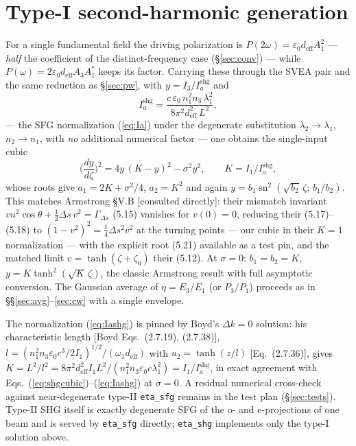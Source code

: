 \documentclass[aps,pra,preprint,amsmath,amssymb,nofootinbib,superscriptaddress]{revtex4-2}
\newcommand{\deff}{d_{\mathrm{eff}}}
\newcommand{\sn}{\operatorname{sn}}
\begin{document}
\section{Type-I second-harmonic generation}\label{sec:shg}

For a single fundamental field the driving polarization is
$P(2\omega)=\varepsilon_0\deff A_1^{2}$ --- \emph{half} the coefficient of
the distinct-frequency case (\S\ref{sec:conv}) --- while
$P(\omega)=2\varepsilon_0\deff A_3A_1^{*}$ keeps its factor. Carrying these
through the SVEA pair and the same reduction as \S\ref{sec:pw}, with
$y=I_3/I_a^{\mathrm{shg}}$ and
\begin{equation}
I_a^{\mathrm{shg}}
=\frac{c\,\varepsilon_0\, n_1^{2} n_3\, \lambda_1^{2}}
      {8\pi^{2}\deff^{2}\,L^{2}},
\label{eq:Iashg}
\end{equation}
--- the SFG normalization (\ref{eq:Ia}) under the degenerate substitution
$\lambda_2\to\lambda_1$, $n_2\to n_1$, with \emph{no} additional numerical
factor --- one obtains the single-input cubic
\begin{equation}
\Big(\frac{dy}{d\zeta}\Big)^{2}=4y\,(K-y)^{2}-\sigma^{2}y^{2},
\qquad K = I_{1}/I_a^{\mathrm{shg}},
\label{eq:shgcubic}
\end{equation}
whose roots give $a_1=2K+\sigma^{2}/4$, $a_2=K^{2}$ and again
$y=b_1\sn^{2}(\sqrt{b_2}\,\zeta;\,b_1/b_2)$. This matches Armstrong \S V.B
[consulted directly]: their mismatch invariant
$vu^2\cos\theta+\tfrac12\Delta s\,v^2=\Gamma_{\Delta s}$ (5.15) vanishes
for $v(0)=0$, reducing their (5.17)--(5.18) to
$(1-v^2)^2=\tfrac14\Delta s^2 v^2$ at the turning points --- our cubic in
their $K=1$ normalization --- with the explicit root (5.21) available as a
test pin, and the matched limit $v=\tanh(\zeta+\zeta_0)$ their (5.12). At $\sigma=0$: $b_1=b_2=K$,
$y=K\tanh^{2}(\sqrt K\,\zeta)$, the classic Armstrong result with full
asymptotic conversion. The Gaussian average of $\eta=E_3/E_1$ (or
$P_3/P_1$) proceeds as in \S\S\ref{sec:avg}--\ref{sec:cw} with a single
envelope.

The normalization (\ref{eq:Iashg}) is pinned by Boyd's $\Delta k=0$
solution: his characteristic length [Boyd Eqs.~(2.7.19), (2.7.38)],
$l=(n_1^2 n_3\varepsilon_0 c^3/2I_1)^{1/2}/(\omega_1\deff)$ with
$u_2=\tanh(z/l)$ [Eq.~(2.7.36)], gives
$K=L^2/l^2=8\pi^2\deff^2 I_1 L^2/(n_1^2 n_3\varepsilon_0 c\lambda_1^2)
=I_1/I_a^{\mathrm{shg}}$, in exact agreement with
Eqs.~(\ref{eq:shgcubic})--(\ref{eq:Iashg}) at $\sigma=0$. A residual
numerical cross-check against near-degenerate type-II \texttt{eta\_sfg}
remains in the test plan (\S\ref{sec:tests}). Type-II SHG itself is exactly degenerate SFG of the
o- and e-projections of one beam and is served by \texttt{eta\_sfg}
directly; \texttt{eta\_shg} implements only the type-I solution above.
\end{document}
